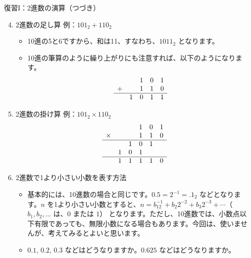\documentclass[10pt, dvipdfmx]{beamer}
\begin{document}
\begin{frame}{復習I：2進数の演算（つづき）}
\begin{enumerate}
\setcounter{enumi}{3}
\item  2進数の足し算 例：\(101_2 + 110_2\)  
\begin{itemize}
    \item 10進の5と6ですから、和は11、すなわち、\(1011_2\) となります。
    \item 10進の筆算のように繰り上がりにも注意すれば、以下のようになります。
{\small
\[ \begin{array}{ccccc} &  & 1  & 0  & 1 \\ +  &  & 1  & 1  & 0 \\ \hline  & 1  & 0  & 1  & 1 \end{array} \]
}
\end{itemize}
\item  2進数の掛け算 例：\(101_2 \times 110_2\)  
{\small
\[ \begin{array}{cccccc}  &  &  & 1  & 0  & 1 \\ \times  &  &  & 1  & 1  & 0\\ \hline  &  & 1  & 0  & 1  & \\  & 1  & 0  & 1  &  & \\ \hline  & 1  & 1  & 1  & 1  & 0 \end{array} \]
}
\item 2進数で1より小さい小数を表す方法
\begin{itemize}
    \item 基本的には、10進数の場合と同じです。\(0.5 = 2^{-1}= .1_2\) などとなります。\(n\) を1より小さい小数とすると、\(n = b_12^{-1} + b_2 2^{-2} + b_3 2^{-3} + \cdots\)（\(b_1, b_2, \ldots\) は、\(0\) または \(1\)） となります。ただし、10進数では、小数点以下有限であっても、無限小数になる場合もあります。今回は、使いませんが、考えてみるとよいと思います。
    \item \(0.1\), \(0.2\), \(0.3\) などはどうなりますか。\(0.625\) などはどうなりますか。
\end{itemize}
\end{enumerate}
\end{frame}
\end{document}

